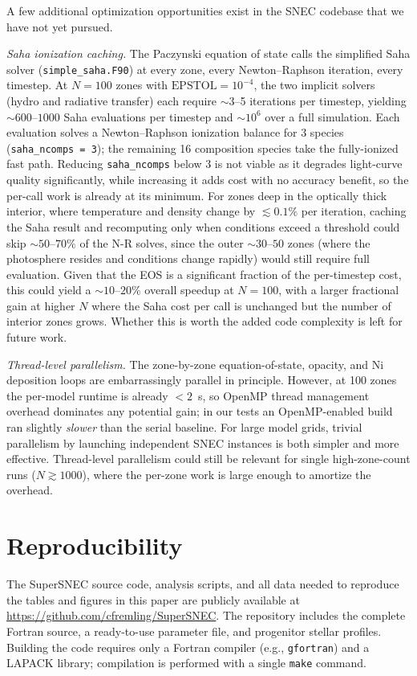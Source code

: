 \documentclass[twocolumn,linenumbers]{aastex701}
\begin{document}
A few additional optimization opportunities exist in the SNEC codebase that we have not yet pursued.

\textit{Saha ionization caching.} The Paczynski equation of state calls the simplified Saha solver (\texttt{simple\_saha.F90}) at every zone, every Newton--Raphson iteration, every timestep. At $N=100$ zones with $\mathrm{EPSTOL}=10^{-4}$, the two implicit solvers (hydro and radiative transfer) each require ${\sim}3$--5 iterations per timestep, yielding ${\sim}600$--$1000$ Saha evaluations per timestep and ${\sim}10^6$ over a full simulation. Each evaluation solves a Newton--Raphson ionization balance for 3 species (\texttt{saha\_ncomps\,=\,3}); the remaining 16 composition species take the fully-ionized fast path. Reducing \texttt{saha\_ncomps} below 3 is not viable as it degrades light-curve quality significantly, while increasing it adds cost with no accuracy benefit, so the per-call work is already at its minimum. For zones deep in the optically thick interior, where temperature and density change by $\lesssim0.1\%$ per iteration, caching the Saha result and recomputing only when conditions exceed a threshold could skip ${\sim}50$--$70\%$ of the N-R solves, since the outer ${\sim}30$--$50$ zones (where the photosphere resides and conditions change rapidly) would still require full evaluation. Given that the EOS is a significant fraction of the per-timestep cost, this could yield a ${\sim}10$--$20\%$ overall speedup at $N=100$, with a larger fractional gain at higher $N$ where the Saha cost per call is unchanged but the number of interior zones grows. Whether this is worth the added code complexity is left for future work.

\textit{Thread-level parallelism.} The zone-by-zone equation-of-state, opacity, and Ni deposition loops are embarrassingly parallel in principle. However, at 100 zones the per-model runtime is already $<2$~s, so OpenMP thread management overhead dominates any potential gain; in our tests an OpenMP-enabled build ran slightly \emph{slower} than the serial baseline. For large model grids, trivial parallelism by launching independent SNEC instances is both simpler and more effective. Thread-level parallelism could still be relevant for single high-zone-count runs ($N \gtrsim 1000$), where the per-zone work is large enough to amortize the overhead.

\section{Reproducibility}
The SuperSNEC source code, analysis scripts, and all data needed to reproduce the tables and figures in this paper are publicly available at \url{https://github.com/cfremling/SuperSNEC}.  The repository includes the complete Fortran source, a ready-to-use parameter file, and progenitor stellar profiles. Building the code requires only a Fortran compiler (e.g., \texttt{gfortran}) and a LAPACK library; compilation is performed with a single \texttt{make} command.
\end{document}
